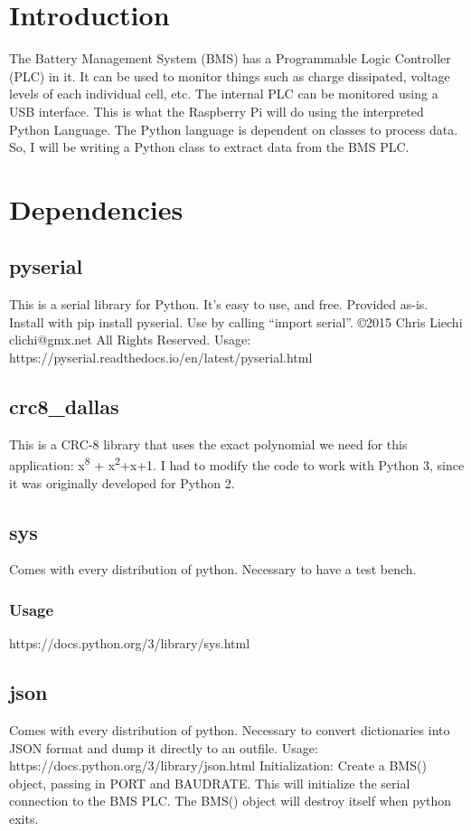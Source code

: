 \section{Introduction}
The Battery Management System (BMS) has a Programmable Logic Controller (PLC) in it. It can be used to monitor things such as charge dissipated, voltage levels of each individual cell, etc.
The internal PLC can be monitored using a USB interface. This is what the Raspberry Pi will do using the interpreted Python Language.
The Python language is dependent on classes to process data. So, I will be writing a Python class to extract data from the BMS PLC.

\section{Dependencies}
\subsection{pyserial}
This is a serial library for Python. It’s easy to use, and free. Provided as-is. Install with pip install pyserial. Use by calling “import serial”. ©2015 Chris Liechi clichi@gmx.net  All Rights Reserved. 
Usage: https://pyserial.readthedocs.io/en/latest/pyserial.html

\subsection{crc8\_dallas} 
This is a CRC-8 library that uses the exact polynomial we need for this application: x\textsuperscript{8} + x\textsuperscript{2}+x+1.  I had to modify the code to work with Python 3, since it was originally developed for Python 2.

\subsection{sys}
Comes with every distribution of python. Necessary to have a test bench.
\subsubsection{Usage}
https://docs.python.org/3/library/sys.html

\subsection{json}
Comes with every distribution of python. Necessary to convert dictionaries into JSON format and dump it directly to an outfile.
Usage: https://docs.python.org/3/library/json.html
Initialization:
Create a BMS() object, passing in PORT and BAUDRATE. This will initialize the serial connection to the BMS PLC.
The BMS() object will destroy itself when python exits.

